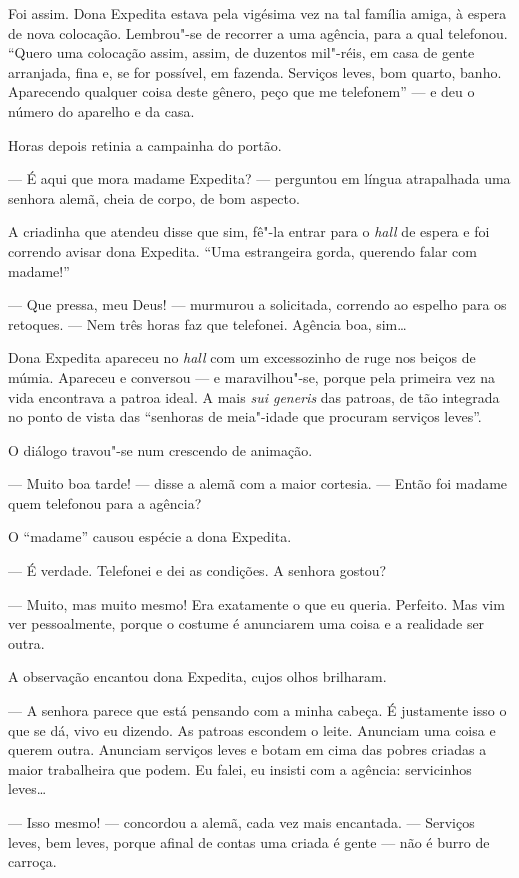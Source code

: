 Foi assim. Dona Expedita estava pela vigésima vez na tal família amiga,
à espera de nova colocação. Lembrou"-se de recorrer a uma agência, para a
qual telefonou. ``Quero uma colocação assim, assim, de duzentos
mil"-réis, em casa de gente arranjada, fina e, se for possível, em
fazenda. Serviços leves, bom quarto, banho. Aparecendo qualquer coisa
deste gênero, peço que me telefonem'' --- e deu o número do aparelho e
da casa.

Horas depois retinia a campainha do portão.

--- É aqui que mora madame Expedita? --- perguntou em língua atrapalhada
uma senhora alemã, cheia de corpo, de bom aspecto.

A criadinha que atendeu disse que sim, fê"-la entrar para o \emph{hall}
de espera e foi correndo avisar dona Expedita. ``Uma estrangeira gorda,
querendo falar com madame!''

--- Que pressa, meu Deus! --- murmurou a solicitada, correndo ao espelho
para os retoques. --- Nem três horas faz que telefonei. Agência boa,
sim\ldots{}

Dona Expedita apareceu no \emph{hall} com um excessozinho de ruge nos
beiços de múmia. Apareceu e conversou --- e maravilhou"-se, porque pela
primeira vez na vida encontrava a patroa ideal. A mais \emph{sui
generis} das patroas, de tão integrada no ponto de vista das ``senhoras
de meia"-idade que procuram serviços leves''.

O diálogo travou"-se num crescendo de animação.

--- Muito boa tarde! --- disse a alemã com a maior cortesia. --- Então
foi madame quem telefonou para a agência?

O ``madame'' causou espécie a dona Expedita.

--- É verdade. Telefonei e dei as condições. A senhora gostou?

--- Muito, mas muito mesmo! Era exatamente o que eu queria. Perfeito.
Mas vim ver pessoalmente, porque o costume é anunciarem uma coisa e a
realidade ser outra.

A observação encantou dona Expedita, cujos olhos brilharam.

--- A senhora parece que está pensando com a minha cabeça. É justamente
isso o que se dá, vivo eu dizendo. As patroas escondem o leite. Anunciam
uma coisa e querem outra. Anunciam serviços leves e botam em cima das
pobres criadas a maior trabalheira que podem. Eu falei, eu insisti com a
agência: servicinhos leves\ldots{}

--- Isso mesmo! --- concordou a alemã, cada vez mais encantada. ---
Serviços leves, bem leves, porque afinal de contas uma criada é gente
--- não é burro de carroça.

